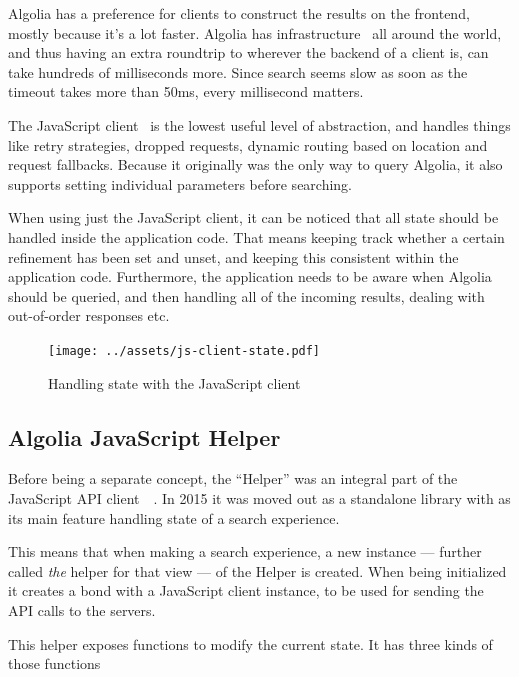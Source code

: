 Algolia has a preference for clients to construct the results on the frontend, mostly because it's a lot faster. Algolia has infrastructure~\cite{algolia-infra} all around the world, and thus having an extra roundtrip to wherever the backend of a client is, can take hundreds of milliseconds more. Since search seems slow as soon as the timeout takes more than 50ms, every millisecond matters.

The JavaScript client~\cite{algolia-js-client} is the lowest useful level of abstraction, and handles things like retry strategies, dropped requests, dynamic routing based on location and request fallbacks. Because it originally was the only way to query Algolia, it also supports setting individual parameters before searching.

When using just the JavaScript client, it can be noticed that all state should be handled inside the application code. That means keeping track whether a certain refinement has been set and unset, and keeping this consistent within the application code. Furthermore, the application needs to be aware when Algolia should be queried, and then handling all of the incoming results, dealing with out-of-order responses etc.

\begin{figure}[H]
\label{figure:js-client-state}
  \centering
  \texttt{[image: ../assets/js-client-state.pdf]}
  \caption{Handling state with the JavaScript client}
\end{figure}


\subsection{Algolia JavaScript Helper} %
\label{sub:algolia_js_helper}

Before being a separate concept, the ``Helper'' was an integral part of the JavaScript API client~\cite{algolia-blog-js-client}~. In 2015 it was moved out as a standalone library with as its main feature handling state of a search experience.

This means that when making a search experience, a new instance --- further called \emph{the} helper for that view --- of the Helper is created. When being initialized it creates a bond with a JavaScript client instance, to be used for sending the API calls to the servers.

This helper exposes functions to modify the current state. It has three kinds of those functions

